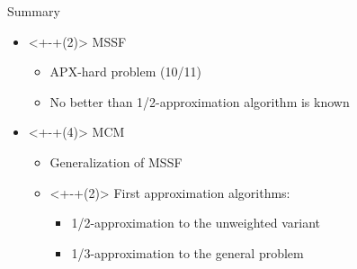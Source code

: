 \begin{frame}{Summary}
\begin{itemize}
	\item<+-+(2)> MSSF
	\begin{itemize}[<+>]
		\item APX-hard problem (10/11)
		\item No better than 1/2-approximation algorithm is known
	\end{itemize}
	\item<+-+(4)> MCM
	\begin{itemize}[<+>]
	  \item Generalization of MSSF
	  \item<+-+(2)> First approximation algorithms:
	  \begin{itemize}[<+>]
		  \item 1/2-approximation to the unweighted variant
		  \item 1/3-approximation to the general problem
	  \end{itemize}
	\end{itemize}
\end{itemize}
\end{frame}